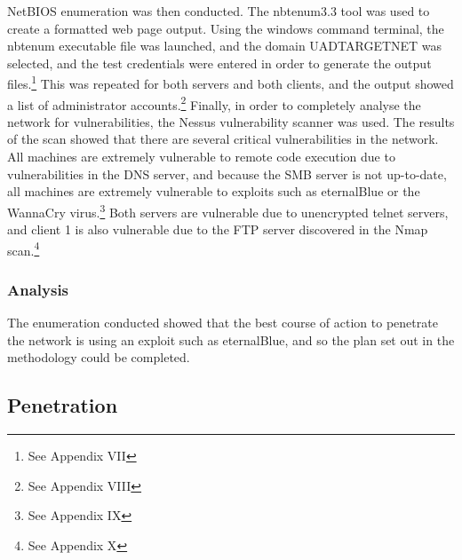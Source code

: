 \documentclass[12pt,a4paper]{article}
\begin{document}
				\acrshort{NetBIOS} enumeration was then conducted. The nbtenum3.3 tool was used to create a formatted web page output. Using the windows command terminal, the nbtenum executable file was launched, and the domain UADTARGETNET was selected, and the test credentials were entered in order to generate the output files.\footnote{See Appendix VII} This was repeated for both servers and both clients, and the output showed a list of administrator accounts.\footnote{See Appendix VIII} Finally, in order to completely analyse the network for vulnerabilities, the Nessus vulnerability scanner was used. The results of the scan showed that there are several critical vulnerabilities in the network. All machines are extremely vulnerable to remote code execution due to vulnerabilities in the \acrshort{DNS} server, and because the \acrshort{SMB} server is not up-to-date, all machines are extremely vulnerable to exploits such as eternalBlue or the WannaCry virus.\footnote{See Appendix IX} Both servers are vulnerable due to unencrypted telnet servers, and client 1 is also vulnerable due to the \acrshort{FTP} server discovered in the Nmap scan.\footnote{See Appendix X}

			\subsubsection{Analysis}
				The enumeration conducted showed that the best course of action to penetrate the network is using an exploit such as eternalBlue, and so the plan set out in the methodology could be completed.

			\subsection{Penetration}
\end{document}
